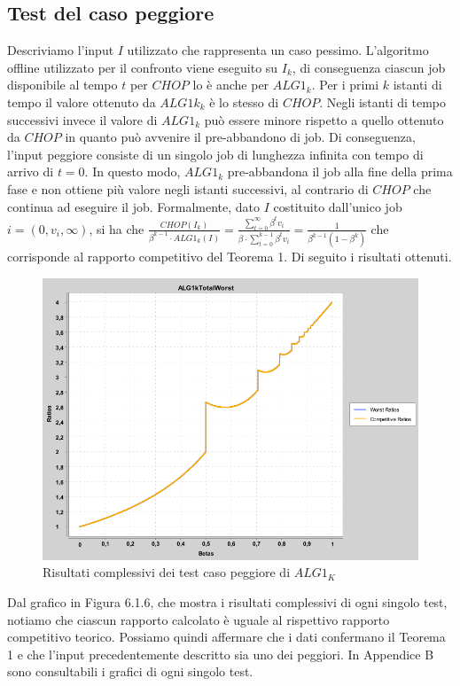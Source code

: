 \documentclass[twoside,openany,titlepage,fleqn,
	headinclude,12pt,a4paper,BCOR5mm,footinclude]{scrbook}
\begin{document}
\subsection{Test del caso peggiore}
Descriviamo l'input $I$ utilizzato che rappresenta un caso pessimo. L'algoritmo offline utilizzato per il confronto viene eseguito su $I_{k}$, di conseguenza ciascun job disponibile al tempo $t$ per $CHOP$ lo è anche per $ALG1_{k}$. Per i primi $k$ istanti di tempo il valore ottenuto da $ALG1k_{k}$ è lo stesso di $CHOP$. Negli istanti di tempo successivi invece il valore di $ALG1_{k}$ può essere minore rispetto a quello ottenuto da $CHOP$ in quanto può avvenire il pre-abbandono di job. Di conseguenza, l'input peggiore consiste di un singolo job di lunghezza infinita con tempo di arrivo di $t = 0$. In questo modo, $ALG1_{k}$ pre-abbandona il job alla fine della prima fase e non ottiene più valore negli istanti successivi, al contrario di $CHOP$ che continua ad eseguire il job. Formalmente, dato $I$ costituito dall'unico job  $i = (0, v_{i},\infty)$, si ha che $\frac{CHOP(I_{k})}{\beta^{k-1} \cdot ALG1_{k}(I)} = \frac{\sum_{t = 0}^{\infty}\beta^{t}v_{i}}{\beta \cdot \sum_{t = 0}^{k-1}\beta^{t} v_{i}} = \frac{1}{\beta^{k-1}(1 - \beta^{k})}$ che corrisponde al rapporto competitivo del Teorema 1. Di seguito i risultati ottenuti.
\begin{figure}[H]
\caption[Unione test caso peggiore $ALG1_{K}$]{Risultati complessivi dei test caso peggiore di $ALG1_{K}$}
\centering
\includegraphics[scale=0.4]{worst/ALG1kTotalWorst.png}
\end{figure}
Dal grafico in Figura 6.1.6, che mostra i risultati complessivi di ogni singolo test, notiamo che ciascun rapporto calcolato è uguale al rispettivo rapporto competitivo teorico. Possiamo quindi affermare che i dati confermano il Teorema 1 e che l'input precedentemente descritto sia uno dei peggiori. In Appendice B sono consultabili i grafici di ogni singolo test.
\end{document}
